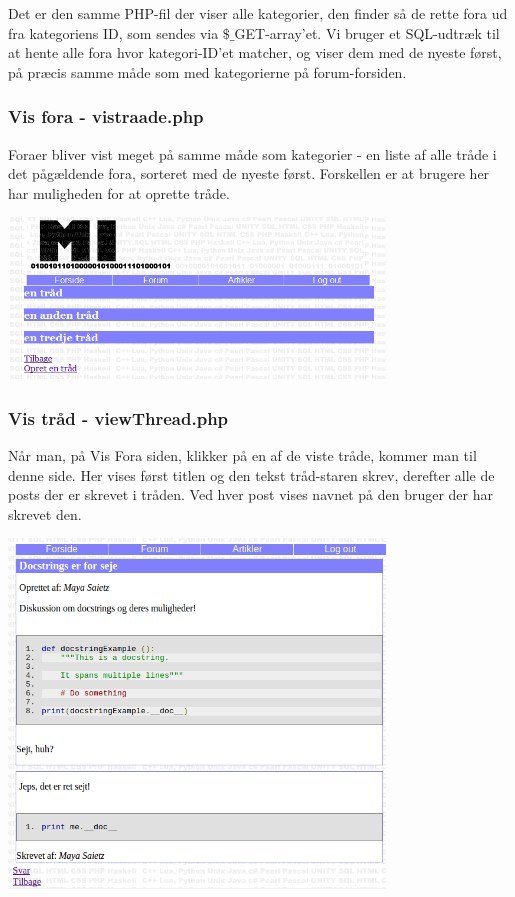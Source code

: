 \documentclass{article}
\begin{document}
Det er den samme PHP-fil der viser alle kategorier, den finder så de rette fora ud fra kategoriens ID, som sendes via $\$\_$GET-array'et. Vi bruger et SQL-udtræk til at hente alle fora hvor kategori-ID'et matcher, og viser dem med de nyeste først, på præcis samme måde som med kategorierne på forum-forsiden.

\subsubsection[Vis fora]{Vis fora - vistraade.php}
Foraer bliver vist meget på samme måde som kategorier - en liste af alle tråde i det pågældende fora, sorteret med de nyeste først. Forskellen er at brugere her har muligheden for at oprette tråde.

\includegraphics[width=100mm]{mi16.png}

\subsubsection[Vis tråd]{Vis tråd - viewThread.php}
Når man, på Vis Fora siden, klikker på en af de viste tråde, kommer man til denne side. Her vises først titlen og den tekst tråd-staren skrev, derefter alle de posts der er skrevet i tråden. Ved hver post vises navnet på den bruger der har skrevet den.

\includegraphics[width=100mm]{mi12.png}
\end{document}
